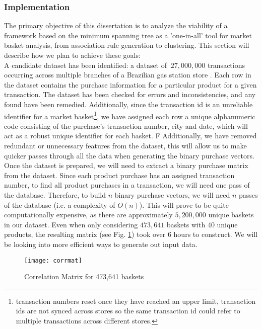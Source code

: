 \documentclass[a4paper,11pt]{article}
\begin{document}
\subsubsection{Implementation}
The primary objective of this dissertation is to analyze the viability of a framework based on the minimum spanning tree as a 'one-in-all' tool for market basket analysis,  from association rule generation to clustering.  This section will describe how we plan to achieve these goals:\\
A candidate dataset has been identified: a dataset of $~27,000,000$ transactions occurring across multiple branches of a Brazilian gas station store \cite{data_source}. Each row in the dataset contains the purchase information for a particular product for a given transaction. The dataset has been checked for errors and inconsistencies, and any found have been remedied. Additionally, since the transaction id is an unreliable identifier for a market basket\footnote{transaction numbers reset once they have reached an upper limit, transaction ids are not synced across stores so the same transaction id could refer to multiple transactions across different stores.}, we have assigned each row a unique alphanumeric code consisting of the purchase's transaction number, city and date, which will act as a robust unique identifier for each basket. F Additionally, we have removed redundant or unnecessary features from the dataset, this will allow us to make quicker passes through all the data when generating the binary purchase vectors.  Once the dataset is prepared, we will need to extract a binary purchase matrix from the dataset.  Since each product purchase has an assigned transaction number, to find all product purchases in a transaction, we will need one pass of the database. Therefore, to build $n$ binary purchase vectors, we will need $n$ passes of the database (i.e.  a complexity of $O(n)$). This will prove to be quite computationally expensive,  as there are approximately $5,200,000$ unique baskets in our dataset.  Even when only considering $473,641$ baskets with $40$ unique products, the resulting matrix (see Fig. \ref{fig:corrmat}) took over 6 hours to construct.  We will be looking into more efficient ways to generate out input data. \\
\begin{figure}[H]
\centering
\texttt{[image: corrmat]}
\caption{Correlation Matrix for 473,641 baskets}
\label{fig:corrmat}
\end{figure}
\end{document}
